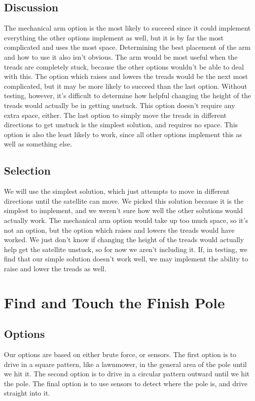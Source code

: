 \documentclass[10pt,letterpaper,onecolumn,journal]{IEEEtran}
\begin{document}
\subsection{Discussion}
The mechanical arm option is the most likely to succeed since it could implement everything the other options implement as well, but it is by far the most complicated and uses the most space. Determining the best placement of the arm and how to use it also isn’t obvious. The arm would be most useful when the treads are completely stuck, because the other options wouldn’t be able to deal with this. The option which raises and lowers the treads would be the next most complicated, but it may be more likely to succeed than the last option. Without testing, however, it’s difficult to determine how helpful changing the height of the treads would actually be in getting unstuck. This option doesn’t require any extra space, either. The last option to simply move the treads in different directions to get unstuck is the simplest solution, and requires no space. This option is also the least likely to work, since all other options implement this as well as something else. 

\subsection{Selection}
We will use the simplest solution, which just attempts to move in different directions until the satellite can move. We picked this solution because it is the simplest to implement, and we weren’t sure how well the other solutions would actually work. The mechanical arm option would take up too much space, so it’s not an option, but the option which raises and lowers the treads would have worked. We just don’t know if changing the height of the treads would actually help get the satellite unstuck, so for now we aren’t including it. If, in testing, we find that our simple solution doesn’t work well, we may implement the ability to raise and lower the treads as well.

\section{Find and Touch the Finish Pole}

\subsection{Options}
Our options are based on either brute force, or sensors. The first option is to drive in a square pattern, like a lawnmower, in the general area of the pole until we hit it. The second option is to drive in a circular pattern outward until we hit the pole. The final option is to use sensors to detect where the pole is, and drive straight into it. 
\end{document}

